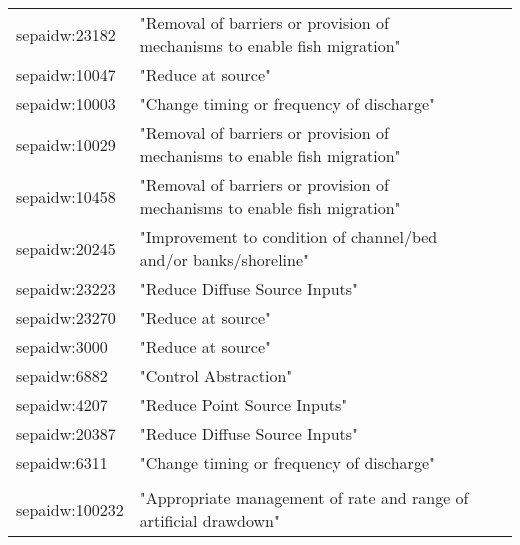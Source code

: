 \documentclass[a4paper,10pt]{article}
\begin{document}
\begin{table}[!tb]
\begin{center}
\begin{tabular}{llcr}
 sepaidw:23182  & "Removal of barriers or provision of mechanisms to enable fish migration"             \\        
 sepaidw:10047  & "Reduce at source"                            \\                                                
 sepaidw:10003  & "Change timing or frequency of discharge"      \\                                              
 sepaidw:10029  & "Removal of barriers or provision of mechanisms to enable fish migration"       \\             
 sepaidw:10458  & "Removal of barriers or provision of mechanisms to enable fish migration"            \\         
sepaidw:20245  & "Improvement to condition of channel/bed and/or banks/shoreline"\\                              
 sepaidw:23223  & "Reduce Diffuse Source Inputs"                           \\                                     
 sepaidw:23270  & "Reduce at source"                                     \\                                       
 sepaidw:3000   & "Reduce at source"                                   \\                                         
 sepaidw:6882   & "Control Abstraction"                              \\                                           
 sepaidw:4207   & "Reduce Point Source Inputs"                     \\                                             
 sepaidw:20387  & "Reduce Diffuse Source Inputs"                 \\                                               
 sepaidw:6311   & "Change timing or frequency of discharge"    \\                                                 \\
sepaidw:100232 & "Appropriate management of rate and range of artificial drawdown"                             \\







\end{tabular}
\label{waterBodyMeasures(waterBodyId,secondaryMeasure)}

\end{center}
\end{table}
\end{document}
